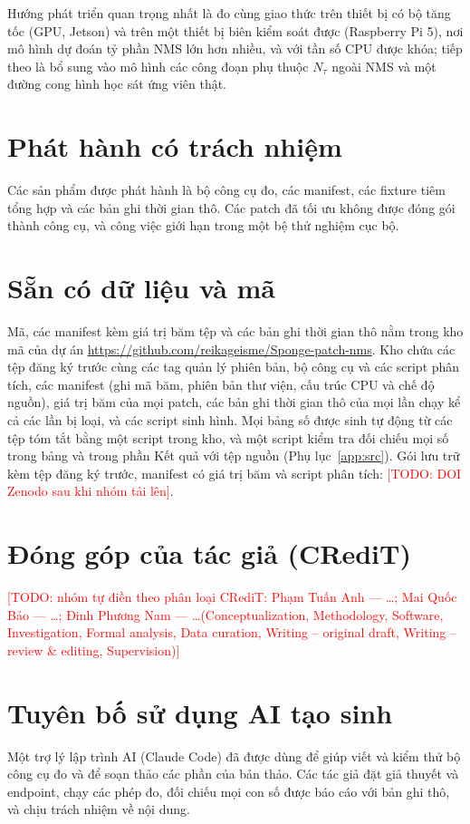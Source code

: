 \documentclass[a4paper,fleqn]{cas-dc}
\newcommand{\todo}[1]{\textcolor{red}{[TODO: #1]}}
\newcommand{\Ntau}{N_{\tau}}
\begin{document}
Hướng phát triển quan trọng nhất là đo cùng giao thức trên thiết bị có bộ tăng tốc (GPU, Jetson) và trên một thiết bị biên kiểm soát được (Raspberry Pi 5), nơi mô hình dự đoán tỷ phần NMS lớn hơn nhiều, và với tần số CPU được khóa; tiếp theo là bổ sung vào mô hình các công đoạn phụ thuộc $\Ntau$ ngoài NMS và một đường cong hình học sát ứng viên thật.

\FloatBarrier
\section*{Phát hành có trách nhiệm}
Các sản phẩm được phát hành là bộ công cụ đo, các manifest, các fixture tiêm tổng hợp và các bản ghi thời gian thô. Các patch đã tối ưu không được đóng gói thành công cụ, và công việc giới hạn trong một bệ thử nghiệm cục bộ.

\section*{Sẵn có dữ liệu và mã}
Mã, các manifest kèm giá trị băm tệp và các bản ghi thời gian thô nằm trong kho mã của dự án \url{https://github.com/reikageisme/Sponge-patch-nms}. Kho chứa các tệp đăng ký trước cùng các tag quản lý phiên bản, bộ công cụ và các script phân tích, các manifest (ghi mã băm, phiên bản thư viện, cấu trúc CPU và chế độ nguồn), giá trị băm của mọi patch, các bản ghi thời gian thô của mọi lần chạy kể cả các lần bị loại, và các script sinh hình. Mọi bảng số được sinh tự động từ các tệp tóm tắt bằng một script trong kho, và một script kiểm tra đối chiếu mọi số trong bảng và trong phần Kết quả với tệp nguồn (Phụ lục~\ref{app:src}). Gói lưu trữ kèm tệp đăng ký trước, manifest có giá trị băm và script phân tích: \todo{DOI Zenodo sau khi nhóm tải lên}.

\section*{Đóng góp của tác giả (CRediT)}
\todo{nhóm tự điền theo phân loại CRediT: Phạm Tuấn Anh --- \ldots; Mai Quốc Bảo --- \ldots; Đinh Phương Nam --- \ldots (Conceptualization, Methodology, Software, Investigation, Formal analysis, Data curation, Writing -- original draft, Writing -- review \& editing, Supervision)}

\section*{Tuyên bố sử dụng AI tạo sinh}
Một trợ lý lập trình AI (Claude Code) đã được dùng để giúp viết và kiểm thử bộ công cụ đo và để soạn thảo các phần của bản thảo. Các tác giả đặt giả thuyết và endpoint, chạy các phép đo, đối chiếu mọi con số được báo cáo với bản ghi thô, và chịu trách nhiệm về nội dung.
\end{document}
